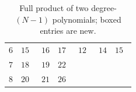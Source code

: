 \documentclass[11pt]{article}
\theoremstyle{definition}
\begin{document}
\begin{table}[!ht]
\begin{tabular}{lllllll}
    $6$ & $15$~\cite{lempel1983complexity,chudnovsky1988algebraic,grassl2007codetables} & $\boxed{16}$                    & $17$~\cite{montgomery2005five}               & $12$~\cite{lempel1983complexity,chudnovsky1988algebraic,griesmer1960bound}   & $\boxed{14}$ & $15$~\cite{winograd1977some}           \\
    $7$ & $18$~\cite{lempel1983complexity,chudnovsky1988algebraic,grassl2007codetables} & $\boxed{19}$                    & $22$~\cite{montgomery2005five}               &                                                                              &              &                                        \\
    $8$ & $20$~\cite{lempel1983complexity,chudnovsky1988algebraic,grassl2007codetables} & $\boxed{21}$                    & $26$~\cite{winograd1977some,fan2007comments} &                                                                              &              &                                        \\
    \bottomrule
  \end{tabular}
  \caption{Full product of two degree-$(N-1)$ polynomials; boxed entries are new.}
  \label{tab:full}
\end{table}
\end{document}
